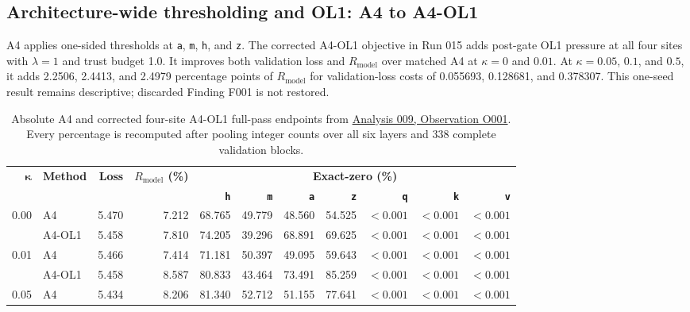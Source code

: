 \documentclass[10pt,a4paper]{article}
\newcommand{\Rmodel}{\ensuremath{R_{\mathrm{model}}}}
\newcommand{\code}[1]{\texttt{#1}}
\begin{document}
\subsection{Architecture-wide thresholding and OL1: A4 to A4-OL1}

A4 applies one-sided thresholds at \code{a}, \code{m}, \code{h}, and \code{z}. The corrected A4-OL1 objective in Run 015 adds post-gate OL1 pressure at all four sites with $\lambda=1$ and trust budget 1.0. It improves both validation loss and \Rmodel{} over matched A4 at $\kappa=0$ and $0.01$. At $\kappa=0.05$, $0.1$, and $0.5$, it adds 2.2506, 2.4413, and 2.4979 percentage points of \Rmodel{} for validation-loss costs of 0.055693, 0.128681, and 0.378307. This one-seed result remains descriptive; discarded Finding F001 is not restored.

{\small
\begin{table}[htbp]
\centering
\caption{Absolute A4 and corrected four-site A4-OL1 full-pass endpoints from \href{../../../analyses/009-2026-08-31-run012-vs-run015-a4-ol1-pressure-sites/observations/O001-h-only-vs-four-site-a4-ol1.md}{Analysis 009, Observation O001}. Every percentage is recomputed after pooling integer counts over all six layers and 338 complete validation blocks.}
\label{tab:a4-ol1-fullpass}
\setlength{\tabcolsep}{2.0pt}
\begin{tabular*}{\textwidth}{@{\extracolsep{\fill}}rl*{9}{r}@{}}
\toprule
$\boldsymbol{\kappa}$ & \textbf{Method} & \textbf{Loss} & \textbf{\Rmodel{} (\%)} & \multicolumn{7}{c}{\textbf{Exact-zero (\%)}} \\
\cmidrule(l){5-11}
& & & & \textbf{\code{h}} & \textbf{\code{m}} & \textbf{\code{a}} & \textbf{\code{z}} & \textbf{\code{q}} & \textbf{\code{k}} & \textbf{\code{v}} \\
\midrule
\multirow{2}{*}{0.00} & A4     & 5.470 & 7.212  & 68.765 & 49.779 & 48.560 & 54.525 & $<0.001$ & $<0.001$ & $<0.001$ \\
                      & A4-OL1 & 5.458 & 7.810  & 74.205 & 39.296 & 68.891 & 69.625 & $<0.001$ & $<0.001$ & $<0.001$ \\
\hline
\multirow{2}{*}{0.01} & A4     & 5.466 & 7.414  & 71.181 & 50.397 & 49.095 & 59.643 & $<0.001$ & $<0.001$ & $<0.001$ \\
                      & A4-OL1 & 5.458 & 8.587  & 80.833 & 43.464 & 73.491 & 85.259 & $<0.001$ & $<0.001$ & $<0.001$ \\
\hline
\multirow{2}{*}{0.05} & A4     & 5.434 & 8.206  & 81.340 & 52.712 & 51.155 & 77.641 & $<0.001$ & $<0.001$ & $<0.001$ \\

\end{tabular*}
\end{table}}
\end{document}

